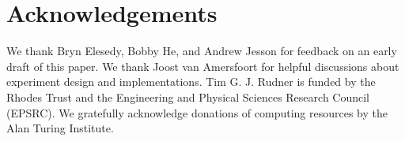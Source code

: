 \section*{Acknowledgements}

We thank Bryn Elesedy, Bobby He, and Andrew Jesson for feedback on an early draft of this paper.
We thank Joost van Amersfoort for helpful discussions about experiment design and implementations.
Tim G. J. Rudner is funded by the Rhodes Trust and the Engineering and Physical Sciences Research Council (EPSRC).
We gratefully acknowledge donations of computing resources by the Alan Turing Institute.